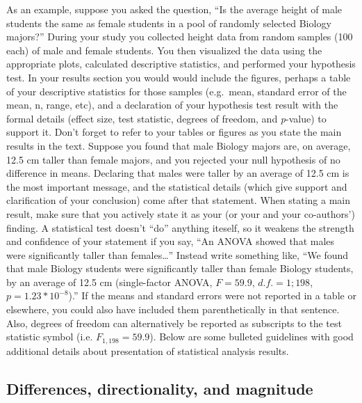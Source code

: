 \documentclass[]{book}
\begin{document}
As an example, suppose you asked the question, ``Is the average height of male students the same as female students in a pool of randomly selected Biology majors?'' During your study you collected height data from random samples (100 each) of male and female students. You then visualized the data using the appropriate plots, calculated descriptive statistics, and performed your hypothesis test. In your results section you would would include the figures, perhaps a table of your descriptive statistics for those samples (e.g.~mean, standard error of the mean, n, range, etc), and a declaration of your hypothesis test result with the formal details (effect size, test statistic, degrees of freedom, and \emph{p}-value) to support it. Don't forget to refer to your tables or figures as you state the main results in the text. Suppose you found that male Biology majors are, on average, 12.5 cm taller than female majors, and you rejected your null hypothesis of no difference in means. Declaring that males were taller by an average of 12.5 cm is the most important message, and the statistical details (which give support and clarification of your conclusion) come after that statement. When stating a main result, make sure that you actively state it as your (or your and your co-authors') finding. A statistical test doesn't ``do'' anything iteself, so it weakens the strength and confidence of your statement if you say, ``An ANOVA showed that males were significantly taller than females\ldots{}'' Instead write something like, ``We found that male Biology students were significantly taller than female Biology students, by an average of 12.5 cm (single-factor ANOVA, \(F=59.9\), \(d.f.=1;198\), \(p=1.23*10^{-8}\)).'' If the means and standard errors were not reported in a table or elsewhere, you could also have included them parenthetically in that sentence. Also, degrees of freedom can alternatively be reported as subscripts to the test statistic symbol (i.e. \(F_{1,198}=59.9\)). Below are some bulleted guidelines with good additional details about presentation of statistical analysis results.

\hypertarget{differences-directionality-and-magnitude}{%
\subsection{Differences, directionality, and magnitude}\label{differences-directionality-and-magnitude}}
\end{document}
